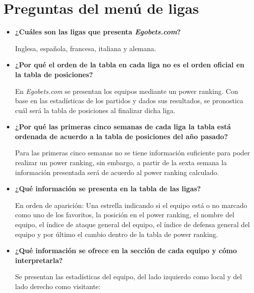 \section{Preguntas del menú de ligas}
\begin{itemize}

\item \textbf{¿Cuáles son las ligas que presenta \emph{Egobets.com}?}


Inglesa, española, francesa, italiana y alemana.

\item \textbf{¿Por qué el orden de la tabla en cada liga no es el orden oficial en la tabla de posiciones?}


En \emph{Egobets.com} se presentan los equipos mediante un power ranking. Con base en las estadísticas de los partidos y dados sus resultados, se pronostica cuál será la tabla de posiciones al finalizar dicha liga.

\item \textbf{¿Por qué las primeras cinco semanas de cada liga la tabla está ordenada de acuerdo a la tabla de posiciones del año pasado?}


Para las primeras cinco semanas no se tiene información suficiente para poder realizar un power ranking, sin embargo, a partir de la sexta semana la información presentada será de acuerdo al power ranking calculado.

\item \textbf{¿Qué información se presenta en la tabla de las ligas?}


En orden de aparición: Una estrella indicando si el equipo está o no marcado como uno de los favoritos, la posición en el power ranking, el nombre del equipo, el índice de ataque general del equipo, el índice de defensa general del equipo y por último el cambio dentro de la tabla de power ranking.

\item \textbf{¿Qué información se ofrece en la sección de cada equipo y cómo interpretarla?}


Se presentan las estadísticas del equipo, del lado izquierdo como local y del lado derecho como visitante:
\begin{enumerate}


\end{enumerate}
\end{itemize}
